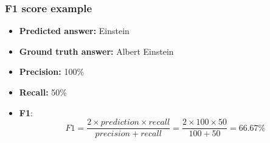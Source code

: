 \documentclass{article}
\begin{document}
\subsubsection{F1 score example}
\begin{itemize}
    \item \textbf{Predicted answer:} Einstein
    \item \textbf{Ground truth answer:} Albert Einstein
    \item \textbf{Precision:} 100\%
    \item \textbf{Recall:} 50\%
    \item \textbf{F1}: 
    $$F1 = \frac{2 \times prediction \times recall}{precision + recall} = \frac{2 \times 100 \times 50}{100 + 50} = 66.67\%$$
\end{itemize}



\end{document}
